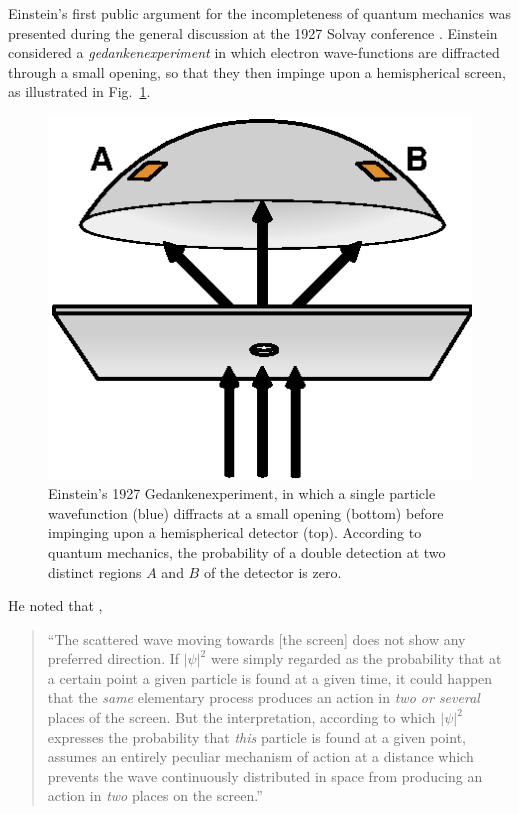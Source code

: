 \documentclass[aps,nofootinbib,12pt]{revtex4-2}
\begin{document}
Einstein's first public argument for the incompleteness of quantum
mechanics was presented during the general discussion at the 1927
Solvay conference \cite{bac_valentini}. Einstein considered a
\textit{gedankenexperiment} in which electron wave-functions are
diffracted through a small opening, so that they then impinge upon a
hemispherical screen, as illustrated in Fig.~\ref{FIG:hemisphere}.
\begin{figure}[t]
\includegraphics[scale=0.8]{hemisphere}
\caption{Einstein's 1927 Gedankenexperiment, in which a single
particle wavefunction (blue) diffracts at a small opening (bottom)
before impinging upon a hemispherical detector (top). According to
quantum mechanics, the probability of a double detection at two
distinct regions $A$ and $B$ of the detector is zero.}
\label{FIG:hemisphere}
\end{figure}
He noted that \cite{E1927},
\begin{quote}
\textquotedblleft The scattered wave moving towards [the screen]
does not show any preferred direction. If $|\psi|^{2}$ were simply
regarded as the probability that at a certain point a given particle
is found at a given time, it could happen that the \textit{same}
elementary process produces an action in \textit{two or several}
places of the screen. But the interpretation, according to which
$|\psi|^{2}$ expresses the probability that \textit{this} particle
is found at a given point, assumes an entirely peculiar mechanism of
action at a distance which prevents the wave continuously
distributed in space from producing an action in \textit{two} places
on the screen.\textquotedblright
\end{quote}
\end{document}
